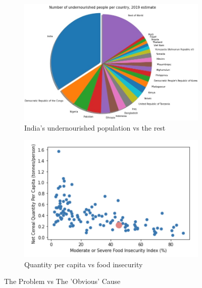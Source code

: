 \documentclass{article}
\begin{document}
\begin{figure}

\begin{subfigure}{0.55\textwidth}
\includegraphics[width=\textwidth]{undernourished_breakup} 
\caption{India's undernourished population vs the rest}
\label{fig:1a}
\end{subfigure}
\begin{subfigure}{0.45\textwidth}
\vspace{9mm}
\includegraphics[width=\textwidth]{quant_vs_insecurity}
\caption{Quantity per capita vs food insecurity}
\label{fig:1b}
\end{subfigure}

\caption{The Problem vs The 'Obvious' Cause}
\label{fig:figure1}
\end{figure}
\end{document}
